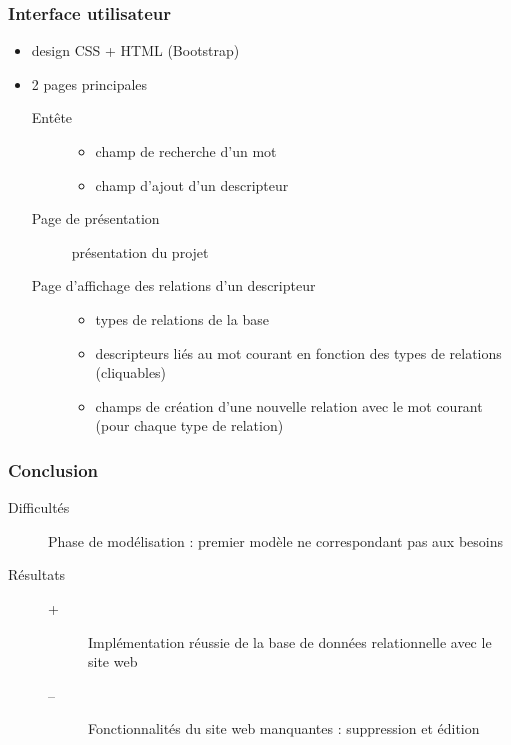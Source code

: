 \documentclass{beamer}
\begin{document}
\begin{frame}
\frametitle{Interface utilisateur}
\begin{itemize}
\item design CSS + HTML (Bootstrap)
\item 2 pages principales
\begin{description}
\item[Entête]
\begin{itemize}
\item  champ de recherche d'un mot 
\item champ d'ajout d'un descripteur 
\end{itemize}
\item[Page de présentation]présentation du projet 
\item[Page d'affichage des relations d'un descripteur] 
\begin{itemize}

\item types de relations de la base
\item descripteurs liés au mot courant en fonction des types de relations (cliquables)
\item champs de création d'une nouvelle relation avec le mot courant (pour chaque type de relation)
\end{itemize}
\end{description}
\end{itemize}

\end{frame}


\begin{frame}
\frametitle{Conclusion}
\begin{description}
\item[Difficultés]Phase de modélisation : premier modèle ne correspondant pas aux besoins
\item [Résultats ] 
\begin{description}
\item[+]Implémentation réussie de la base de données relationnelle avec le site web
\item[--]Fonctionnalités du site web manquantes : suppression et édition 
\end{description}
\end{description}

\end{frame}
\end{document}
